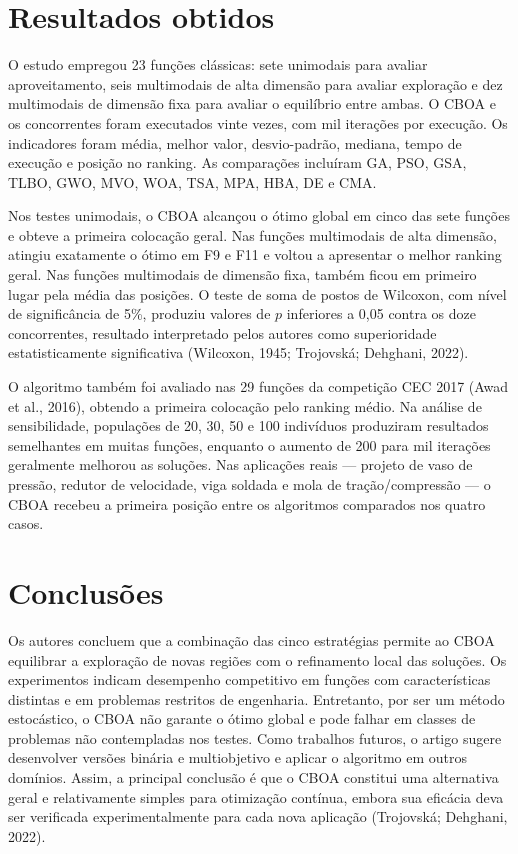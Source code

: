 \documentclass[12pt,a4paper]{article}
\begin{document}
\section{Resultados obtidos}

O estudo empregou 23 funções clássicas: sete unimodais para avaliar
aproveitamento, seis multimodais de alta dimensão para avaliar exploração e dez
multimodais de dimensão fixa para avaliar o equilíbrio entre ambas. O CBOA e
os concorrentes foram executados vinte vezes, com mil iterações por execução.
Os indicadores foram média, melhor valor, desvio-padrão, mediana, tempo de
execução e posição no ranking. As comparações incluíram GA, PSO, GSA, TLBO,
GWO, MVO, WOA, TSA, MPA, HBA, DE e CMA.

Nos testes unimodais, o CBOA alcançou o ótimo global em cinco das sete funções
e obteve a primeira colocação geral. Nas funções multimodais de alta dimensão,
atingiu exatamente o ótimo em F9 e F11 e voltou a apresentar o melhor ranking
geral. Nas funções multimodais de dimensão fixa, também ficou em primeiro
lugar pela média das posições. O teste de soma de postos de Wilcoxon, com nível
de significância de 5\%, produziu valores de $p$ inferiores a 0,05 contra os
doze concorrentes, resultado interpretado pelos autores como superioridade
estatisticamente significativa (Wilcoxon, 1945; Trojovská; Dehghani, 2022).

O algoritmo também foi avaliado nas 29 funções da competição CEC 2017 (Awad et
al., 2016), obtendo a primeira colocação pelo ranking médio. Na análise de
sensibilidade, populações de 20, 30, 50 e 100 indivíduos produziram resultados
semelhantes em muitas funções, enquanto o aumento de 200 para mil iterações
geralmente melhorou as soluções. Nas aplicações reais --- projeto de vaso de
pressão, redutor de velocidade, viga soldada e mola de tração/compressão --- o
CBOA recebeu a primeira posição entre os algoritmos comparados nos quatro
casos.

\section{Conclusões}

Os autores concluem que a combinação das cinco estratégias permite ao CBOA
equilibrar a exploração de novas regiões com o refinamento local das soluções.
Os experimentos indicam desempenho competitivo em funções com características
distintas e em problemas restritos de engenharia. Entretanto, por ser um
método estocástico, o CBOA não garante o ótimo global e pode falhar em classes
de problemas não contempladas nos testes. Como trabalhos futuros, o artigo
sugere desenvolver versões binária e multiobjetivo e aplicar o algoritmo em
outros domínios. Assim, a principal conclusão é que o CBOA constitui uma
alternativa geral e relativamente simples para otimização contínua, embora sua
eficácia deva ser verificada experimentalmente para cada nova aplicação
(Trojovská; Dehghani, 2022).
\end{document}
